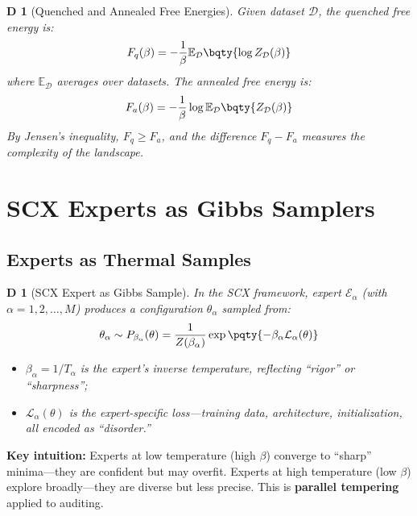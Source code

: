 \documentclass[12pt,a4paper]{article}
\newtheorem{definition}[theorem]Definition
\newcommand{\E}{\mathbb{E}}
\newcommand{\D}{\mathcal{D}}
\newcommand{\loss}{\mathcal{L}}
\begin{document}
\begin{definition}[Quenched and Annealed Free Energies]
Given dataset \(\D\), the quenched free energy is:
\begin{equation}\label{eq:quenched}
F_q(\beta) = -\frac{1}{\beta} \E_\D\bqty{\log Z_\D(\beta)}
\end{equation}
where \(\E_\D\) averages over datasets. The annealed free energy is:
\begin{equation}
F_a(\beta) = -\frac{1}{\beta} \log \E_\D\bqty{Z_\D(\beta)}
\end{equation}
By Jensen's inequality, \(F_q \geq F_a\), and the difference \(F_q - F_a\) measures the complexity of the landscape.
\end{definition}
\section{SCX Experts as Gibbs Samplers}
\subsection{Experts as Thermal Samples}
\begin{definition}[SCX Expert as Gibbs Sample]
In the SCX framework, expert \(\mathcal{E}_\alpha\) (with \(\alpha = 1, 2, \ldots, M\)) produces a configuration \(\theta_\alpha\) sampled from:
\begin{equation}\label{eq:expert_sample}
\theta_\alpha \sim P_{\beta_\alpha}(\theta) = \frac{1}{Z(\beta_\alpha)} \exp\pqty{-\beta_\alpha \loss_\alpha(\theta)}
\end{equation}
\begin{itemize}
    \item \(\beta_\alpha = 1/T_\alpha\) is the expert's inverse temperature, reflecting ``rigor'' or ``sharpness'';
    \item \(\loss_\alpha(\theta)\) is the expert-specific loss---training data, architecture, initialization, all encoded as ``disorder.''
\end{itemize}
\end{definition}

\textbf{Key intuition:} Experts at low temperature (high \(\beta\)) converge to ``sharp'' minima---they are confident but may overfit. Experts at high temperature (low \(\beta\)) explore broadly---they are diverse but less precise. This is \textbf{parallel tempering} applied to auditing.
\end{document}
